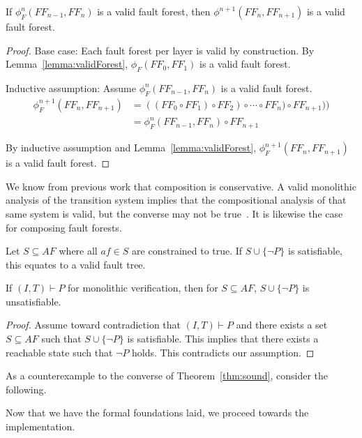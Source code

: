 \begin{theorem} If $\phi_F^n(\mathit{FF_{n-1}}, \mathit{FF_n})$ is a valid fault forest, then $\phi^{n+1}(\mathit{FF_n}, \mathit{FF_{n+1}})$ is a valid fault forest.
\begin{proof}

Base case: Each fault forest per layer is valid by construction. By Lemma~\ref{lemma:validForest}, $\phi_F(\mathit{FF_0}, \mathit{FF_1})$ is a valid fault forest.

Inductive assumption: Assume $\phi_F^n(\mathit{FF_{n-1}}, \mathit{FF_n})$ is a valid fault forest.
\begin{equation*}
\begin{split}
\phi_F^{n+1}(\mathit{FF_n}, \mathit{FF_{n+1}}) &= ((\mathit{FF_0} \circ \mathit{FF_1}) \circ \mathit{FF}_2) \circ \cdots \circ \mathit{FF_n}) \circ \mathit{FF_{n+1}})) \\
  &= \phi_F^n(\mathit{FF_{n-1}}, \mathit{FF_n}) \circ \mathit{FF_{n+1}}
\end{split}
\end{equation*}


By inductive assumption and Lemma~\ref{lemma:validForest}, $\phi_F^{n+1}(\mathit{FF_n}, \mathit{FF_{n+1}})$ is a valid fault forest.

\end{proof}
\label{thm:indForest}
\end{theorem}


We know from previous work that composition is conservative. A valid monolithic analysis of the transition system implies that the compositional analysis of that same system is valid, but the converse may not be true~\cite{}. It is likewise the case for composing fault forests. 

Let $S \subseteq \mathit{AF}$ where all $\mathit{af} \in S$ are constrained to true. If $S \cup \{\neg P\}$ is satisfiable, this equates to a valid fault tree. 

\begin{theorem} If $(I,T) \vdash P$ for monolithic verification, then for $S \subseteq \mathit{AF}$, $S \cup \{\neg P\}$ is unsatisfiable.
\begin{proof}
Assume toward contradiction that $(I,T) \vdash P$ and there exists a set $S \subseteq \mathit{AF}$ such that $S \cup \{\neg P\}$ is satisfiable. This implies that there exists a reachable state such that $\neg P$ holds. This contradicts our assumption. 
\end{proof}
\label{thm:sound}
\end{theorem}

As a counterexample to the converse of Theorem~\ref{thm:sound}, consider the following. 

Now that we have the formal foundations laid, we proceed towards the implementation. 






